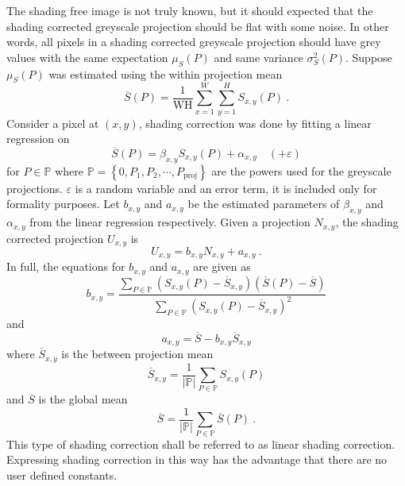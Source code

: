 The shading free image is not truly known, but it should expected that the shading corrected greyscale projection should be flat with some noise. In other words, all pixels in a shading corrected greyscale projection should have grey values with the same expectation $\mu_{S}(P)$ and same variance $\sigma_{S}^2(P)$. Suppose $\mu_{S}(P)$ was estimated using the within projection mean
\begin{equation}
\overline{S}(P) = \dfrac{1}{\text{WH}}
\sum_{x=1}^W\sum_{y=1}^H S_{x,y}(P) \ .
\end{equation}
Consider a pixel at $(x,y)$, shading correction was done by fitting a linear regression on
\begin{equation}
\overline{S}(P) = \beta_{x,y} S_{x,y}(P) + \alpha_{x,y} \quad(+\varepsilon)
\end{equation}
for $P\in \mathbb{P}$ where $\mathbb{P} = \left\{0,P_1,P_2,\cdots, P_\text{proj}\right\}$ are the powers used for the greyscale projections. $\varepsilon$ is a random variable and an error term, it is included only for formality purposes. Let $b_{x,y}$ and $a_{x,y}$ be the estimated parameters of $\beta_{x,y}$ and $\alpha_{x,y}$ from the linear regression respectively. Given a projection $N_{x,y}$, the shading corrected projection $U_{x,y}$ is
\begin{equation}
U_{x,y} = b_{x,y} N_{x,y} + a_{x,y} \ .
\end{equation}
In full, the equations for $b_{x,y}$ and $a_{x,y}$ are given as
\begin{equation}
b_{x,y} = \dfrac{
  \sum_{P\in\mathbb{P}}(S_{x,y}(P) - \overline{S}_{x,y})(\overline{S}(P) - \overline{S})
}{
  \sum_{P\in\mathbb{P}}(S_{x,y}(P) - \overline{S}_{x,y})^2
}
\end{equation}
and
\begin{equation}
a_{x,y} = \overline{S} - b_{x,y}\overline{S}_{x,y}
\end{equation}
where $\overline{S}_{x,y}$ is the between projection mean
\begin{equation}
\overline{S}_{x,y} = \dfrac{1}{|\mathbb{P}|}\sum_{P\in\mathbb{P}}S_{x,y}(P)
\end{equation}
and $\overline{S}$ is the global mean
\begin{equation}
\overline{S} = \dfrac{1}{|\mathbb{P}|}\sum_{P\in\mathbb{P}}\overline{S}(P) \ .
\end{equation}
This type of shading correction shall be referred to as linear shading correction. Expressing shading correction in this way has the advantage that there are no user defined constants.


